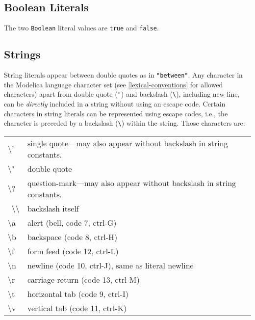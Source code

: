 \subsection{Boolean Literals}

The two \lstinline[basicstyle=\ttfamily]!Boolean! literal values are \lstinline[basicstyle=\ttfamily]!true! and \lstinline[basicstyle=\ttfamily]!false!.

\subsection{Strings}

String literals appear between double quotes as in \lstinline[basicstyle=\ttfamily]!"between"!. Any
character in the Modelica language character set (see \autoref{lexical-conventions} for
allowed characters) apart from double quote (\lstinline[basicstyle=\ttfamily]!"!) and backslash
(\lstinline[basicstyle=\ttfamily]!\!), including new-line, can be \emph{directly} included
in a string without using an escape code. Certain characters in string
literals can be represented using escape codes, i.e., the character is
preceded by a backslash (\lstinline[basicstyle=\ttfamily]!\!) within the string. Those
characters are:

\begin{longtable}[c]{@{}ll@{}}
\textbackslash{}' & single quote---may also appear without backslash in
string constants.\\ 
\textbackslash{}" & double quote\\ 
\textbackslash{}? & question-mark---may also appear without backslash in
string constants.\\ \
\textbackslash{}\textbackslash{} & backslash itself\\ 
\textbackslash{}a & alert (bell, code 7, ctrl-G)\\ 
\textbackslash{}b & backspace (code 8, ctrl-H)\\ 
\textbackslash{}f & form feed (code 12, ctrl-L)\\ 
\textbackslash{}n & newline (code 10, ctrl-J), same as literal
newline\\ 
\textbackslash{}r & carriage return (code 13, ctrl-M)\\ 
\textbackslash{}t & horizontal tab (code 9, ctrl-I)\\ 
\textbackslash{}v & vertical tab (code 11, ctrl-K)\\ 
\end{longtable}

